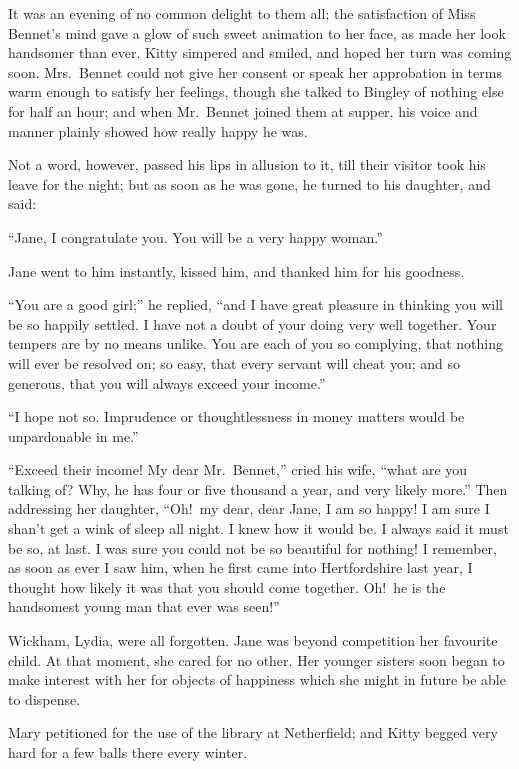 \documentclass[12pt,english]{book}
\begin{document}
It was an evening of no common delight to them all; the satisfaction
of Miss Bennet's mind gave a glow of such sweet animation to her face,
as made her look handsomer than ever. Kitty simpered and smiled, and
hoped her turn was coming soon. Mrs.\ Bennet could not give her consent
or speak her approbation in terms warm enough to satisfy her feelings,
though she talked to Bingley of nothing else for half an hour; and
when Mr.\ Bennet joined them at supper, his voice and manner plainly
showed how really happy he was.

Not a word, however, passed his lips in allusion to it, till their
visitor took his leave for the night; but as soon as he was gone,
he turned to his daughter, and said:

{}``Jane, I congratulate you. You will be a very happy woman.''

Jane went to him instantly, kissed him, and thanked him for his goodness.

{}``You are a good girl;'' he replied, {}``and I have great pleasure
in thinking you will be so happily settled. I have not a doubt of
your doing very well together. Your tempers are by no means unlike.
You are each of you so complying, that nothing will ever be resolved
on; so easy, that every servant will cheat you; and so generous, that
you will always exceed your income.''

{}``I hope not so. Imprudence or thoughtlessness in money matters
would be unpardonable in me.''

{}``Exceed their income! My dear Mr.\ Bennet,'' cried his wife,
{}``what are you talking of? Why, he has four or five thousand a
year, and very likely more.'' Then addressing her daughter, {}``Oh!\ my
dear, dear Jane, I am so happy! I am sure I shan't get a wink of sleep
all night. I knew how it would be. I always said it must be so, at
last. I was sure you could not be so beautiful for nothing! I remember,
as soon as ever I saw him, when he first came into Hertfordshire last
year, I thought how likely it was that you should come together. Oh!\ he
is the handsomest young man that ever was seen!''

Wickham, Lydia, were all forgotten. Jane was beyond competition her
favourite child. At that moment, she cared for no other. Her younger
sisters soon began to make interest with her for objects of happiness
which she might in future be able to dispense.

Mary petitioned for the use of the library at Netherfield; and Kitty
begged very hard for a few balls there every winter.
\end{document}
